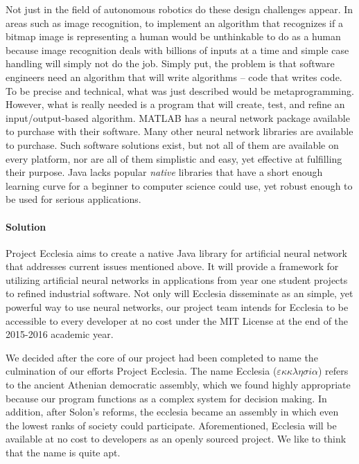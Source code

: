 \documentclass[letterpaper, 10pt]{article}
\begin{document}
	Not just in the field of autonomous robotics do these design challenges appear. In areas such as image recognition, to implement an algorithm that recognizes if a bitmap image is representing a human would be unthinkable to do as a human because image recognition deals with billions of inputs at a time and simple case handling will simply not do the job. Simply put, the problem is that software engineers need an algorithm that will write algorithms -- code that writes code. To be precise and technical, what was just described would be metaprogramming. However, what is really needed is a program that will create, test, and refine an input/output-based algorithm. MATLAB has a neural network package available to purchase with their software. Many other neural network libraries are available to purchase. Such software solutions exist, but not all of them are available on every platform, nor are all of them simplistic and easy, yet effective at fulfilling their purpose. Java lacks popular \emph{native} libraries that have a short enough learning curve for a beginner to computer science could use, yet robust enough to be used for serious applications.
	\paragraph{Solution} Project Ecclesia aims to create a native Java library for artificial neural network that addresses current issues mentioned above. It will provide a framework for utilizing artificial neural networks in applications from year one student projects to refined industrial software. Not only will Ecclesia disseminate as an simple, yet powerful way to use neural networks, our project team intends for Ecclesia to be accessible to every developer at no cost under the MIT License at the end of the 2015-2016 academic year.
	
	We decided after the core of our project had been completed to name the culmination of our efforts Project Ecclesia. The name Ecclesia ($\varepsilon \kappa \kappa \lambda \eta \sigma i \alpha$) refers to the ancient Athenian democratic assembly, which we found highly appropriate because our program functions as a complex system for decision making. In addition, after Solon's reforms, the ecclesia became an assembly in which even the lowest ranks of society could participate. Aforementioned, Ecclesia will be available at no cost to developers as an openly sourced project. We like to think that the name is quite apt.
\clearpage
\end{document}
